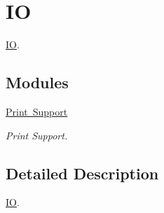 \hypertarget{group__RTEMSAPIIO}{}\section{IO}
\label{group__RTEMSAPIIO}


\mbox{\hyperlink{structIO}{IO}}.  


\subsection*{Modules}
\begin{DoxyCompactItemize}
\item 
\mbox{\hyperlink{group__RTEMSAPIPrintSupport}{Print Support}}
\begin{DoxyCompactList}\small\item\em Print Support. \end{DoxyCompactList}\end{DoxyCompactItemize}


\subsection{Detailed Description}
\mbox{\hyperlink{structIO}{IO}}. 

